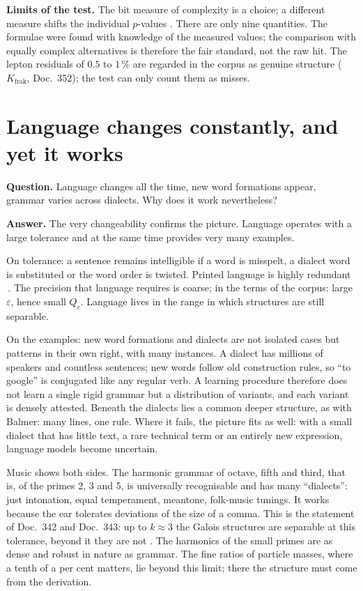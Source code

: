 \textbf{Limits of the test.} The bit measure of complexity is a choice; a different measure shifts the
individual $p$-values \SM. There are only nine quantities. The formulae were found with knowledge of
the measured values; the comparison with equally complex alternatives is therefore the fair standard,
not the raw hit. The lepton residuals of $0.5$ to $1\,\%$ are regarded in the corpus as genuine
structure ($K_{\mathrm{frak}}$, Doc.~352); the test can only count them as misses.

\section{Language changes constantly, and yet it works}

\textbf{Question.} Language changes all the time, new word formations appear, grammar varies across
dialects. Why does it work nevertheless?

\textbf{Answer.} The very changeability confirms the picture. Language operates with a large
tolerance and at the same time provides very many examples.

On tolerance: a sentence remains intelligible if a word is misspelt, a dialect word is substituted or
the word order is twisted. Printed language is highly redundant \QM\,\cite{Shannon1951}. The precision
that language requires is coarse; in the terms of the corpus: large $\varepsilon$, hence small $Q_c$.
Language lives in the range in which structures are still separable.

On the examples: new word formations and dialects are not isolated cases but patterns in their own
right, with many instances. A dialect has millions of speakers and countless sentences; new words
follow old construction rules, so \enquote{to google} is conjugated like any regular verb. A learning
procedure therefore does not learn a single rigid grammar but a distribution of variants, and each
variant is densely attested. Beneath the dialects lies a common deeper structure, as with Balmer: many
lines, one rule. Where it fails, the picture fits as well: with a small dialect that has little text,
a rare technical term or an entirely new expression, language models become uncertain.

Music shows both sides. The harmonic grammar of octave, fifth and third, that is, of the primes 2, 3
and 5, is universally recognisable and has many \enquote{dialects}: just intonation, equal
temperament, meantone, folk-music tunings. It works because the ear tolerates deviations of the size
of a comma. This is the statement of Doc.~342 and Doc.~343: up to $k\approx3$ the Galois structures are
separable at this tolerance, beyond it they are not \BM. The harmonics of the small primes are as dense
and robust in nature as grammar. The fine ratios of particle masses, where a tenth of a per cent
matters, lie beyond this limit; there the structure must come from the derivation.


